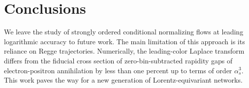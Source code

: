 \section{Conclusions}\label{sec:conclusions}

We leave the study of strongly ordered conditional normalizing flows at
leading logarithmic accuracy to future work. The main limitation of this
approach is its reliance on Regge trajectories. Numerically, the
leading-color Laplace transform differs from the fiducial cross section
of zero-bin-subtracted rapidity gaps of electron-positron annihilation
by less than one percent up to terms of order $\alpha_s^3$. This work
paves the way for a new generation of Lorentz-equivariant networks.

